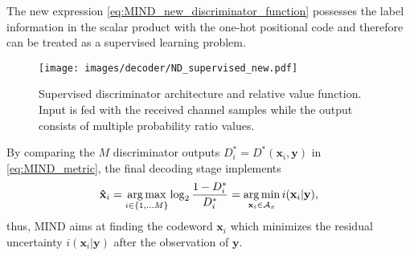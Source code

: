 The new expression \eqref{eq:MIND_new_discriminator_function} possesses the label information in the scalar product with the one-hot positional code and therefore can be treated as a supervised learning problem. 
\begin{figure}
	\centering
	\texttt{[image: images/decoder/ND\_supervised\_new.pdf]}
	\caption{Supervised discriminator architecture and relative value function. Input is fed with the received channel samples while the output consists of multiple probability ratio values.}
	\label{fig:MIND_supervised}
\end{figure} 

By comparing the $M$ discriminator outputs $D^*_i = D^*(\mathbf{x}_i,\mathbf{y})$ in \eqref{eq:MIND_metric}, the final decoding stage implements
\begin{equation}
\mathbf{\hat{x}}_i = \operatorname*{arg\,max}_{i \in \{1,...M\}} \log_2 \frac{1-D^*_i}{D^*_i} = \operatorname*{arg\,min}_{\mathbf{x}_i \in \mathcal{A}_x} i(\mathbf{x}_i|\mathbf{y}),
\end{equation}
thus, MIND aims at finding the codeword $\mathbf{x}_i$ which minimizes the residual uncertainty $i(\mathbf{x}_i|\mathbf{y})$ after the observation of $\mathbf{y}$.

